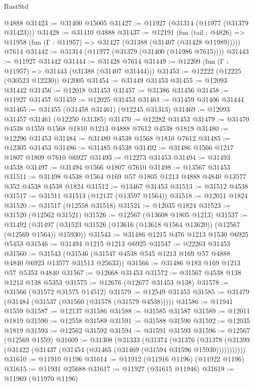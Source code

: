 \begin{lexlean}{RustStd}
\begin{coremodule}
    @4888
@31423 := @31400 @15005
@31427 := @11927 (@31314 (@11977 (@31379 @31423)))
@31428 := @31410 @4888
@31437 := @12191
    (fun (tail : @4826) => @11958 (fun (Γ : @11957) => @31427 (@31388 (@31407 (@31428 @11989)))))
    @7614
@31442 := @31314 (@11977 (@31379 (@31400 (@11986 @7615))))
@31443 := @11927 @31442
@31444 := @31428 @7614
@31449 := @12209 (fun (Γ : @11957) => @31443 (@31388 (@31407 @31444)))
@31453 := @12222 (@12225 (@30523 @12230)) @12005
@31454 := @31449 @31453
@31455 := @12093 @31442
@31456 := @12018 @31453
@31457 := @31386 @31456
@31458 := @11927 @31457
@31459 := @12025 @31453
@31461 := @31459 @31406 @31444
@31465 := @31455 (@31458 @31461) (@12245 @31313)
@31469 := @12093 @31457 @31461 (@12250 @31385)
@31470 := @12282 @31453
@31479 := @31470 @4538 @1559 @1568 @1810 @1213 @4888 @7612 @4538 @1819
@31480 := @12296 @31453
@31484 := @31480 @4538 @1568 @1810 @7612
@31485 := @12305 @31453
@31486 := @31485 @4538
@31492 := @31486 @1566 @1217 @1807 @1809 @7610 @6927
@31493 := @12273 @31453
@31494 := @31493 @4538
@31497 := @31494 @1566 @1807 @7610
@31498 := @13567 @31453
@31511 := @31498 @4538 @1564 @169 @57 @1805 @1213 @4888 @4840 @13577 @352 @4538 @4538 @1824
@31512 := @13467 @31453
@31513 := @31512 @4538
@31517 := @31511 @31513 (@12137 (@13597 @1564))
@31518 := @12011 @1824
@31520 := @31517 (@12558 @31518)
@31521 := @12035 @1824
@31523 := @31520 (@12562 @31521)
@31526 := @12567 (@13608 @1805 @1213)
@31537 := @31492
    (@31497 (@31523 @31526 (@13616 (@13618 @1564 @13620)) (@12567 (@12569 @1564)) @15930))
@31543 := @31486 @1215 @476 @1213 @1530 @6925 @5453
@31546 := @31494 @1215 @1213 @6925
@31547 := @22263 @31453
@31560 := @31543 (@31546 (@31547 @4538 @545 @1213 @169 @57 @4888 @4840 @6923 @13577 @31513 @25633))
@31566 := @31486 @183 @169 @1213 @57 @5353 @4840
@31567 := @12668 @31453
@31572 := @31567 @4538 @138 @1213 @138 @5353
@31575 := @12676 (@12677 @31453 @138)
@31578 := @31566 (@31572 @31575 @14512)
@31579 := @12549 @31453
@31585 := @31479 (@31484 (@31537 (@31560 (@31578 (@31579 @4538)))))
@31586 := @11941 @1559
@31587 := @12137 @31586
@31588 := @31585 @31587
@31589 := @12011 @1819
@31590 := @12558 @31589
@31591 := @31588 @31590
@31592 := @12035 @1819
@31593 := @12562 @31592
@31594 := @31591 @31593
@31596 := @12567 (@12569 @1559)
@31609 := @31308
    (@31333
      (@31374
        (@31376
          (@31378 (@31399 (@31422 (@31437 (@31454 (@31465 (@31469 (@31594 @31596 @15930)))))))))))
@31610 := @11910 @1196
@31614 := @11912 (@11916 @1196) (@11922 @1196)
@31615 := @11931 @25688
@31617 := @11927 (@31615 @11946)
@31619 := @11969 (@11970 @1196)

\end{coremodule}
\end{lexlean}
